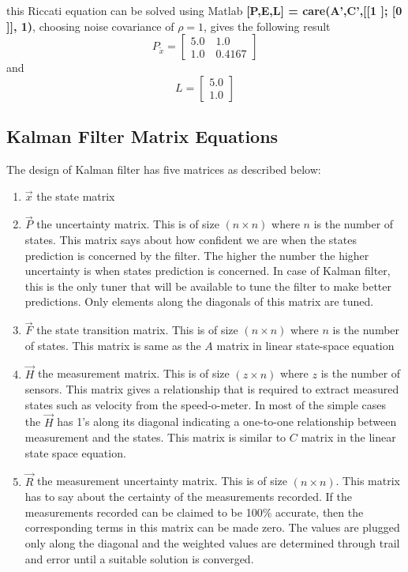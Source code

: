 this Riccati equation can be solved using Matlab \textbf{[P,E,L] = care(A',C',[[1 ]; [0 ]], 1)}, choosing noise covariance of $\rho = 1$, gives the following result
$$P_{\tilde{x}} = \begin{bmatrix}
5.0 \quad 1.0 \\ 1.0 \quad 0.4167
\end{bmatrix}$$ and
$$ L = \begin{bmatrix}
5.0 \\ 1.0
\end{bmatrix}$$

\subsection{Kalman Filter Matrix Equations}

The design of Kalman filter has five matrices as described below:
\begin{enumerate}
	\item $\vec{x}$ the state matrix
	\item $\vec{P}$ the uncertainty matrix. This is of size $(n \times n)$ where $n$ is the number of states. This matrix says about how confident we are when the states prediction is concerned by the filter. The higher the number the higher uncertainty is when states prediction is concerned. In case of Kalman filter, this is the only tuner that will be available to tune the filter to make better predictions. Only elements along the diagonals of this matrix are tuned.
	\item $\vec{F}$ the state transition matrix. This is of size $(n \times n)$ where $n$ is the number of states. This matrix is same as the $A$ matrix in linear state-space equation 
	\item $\vec{H}$ the measurement matrix. This is of size $(z \times n)$ where $z$ is the number of sensors. This matrix gives a relationship that is required to extract measured states such as velocity from the speed-o-meter. In most of the simple cases the  $\vec{H}$ has 1's along its diagonal indicating a one-to-one relationship between measurement and the states. This matrix is similar to $C$ matrix in the linear state space equation.
	\item $\vec{R}$ the measurement uncertainty matrix. This is of size $(n \times n)$. This matrix has to say about the certainty of the measurements recorded. If the measurements recorded can be claimed to be 100$\%$ accurate, then the corresponding terms in this matrix can be made zero. The values are plugged only along the diagonal and the weighted values are determined through trail and error until a suitable solution is converged.  
\end{enumerate}


